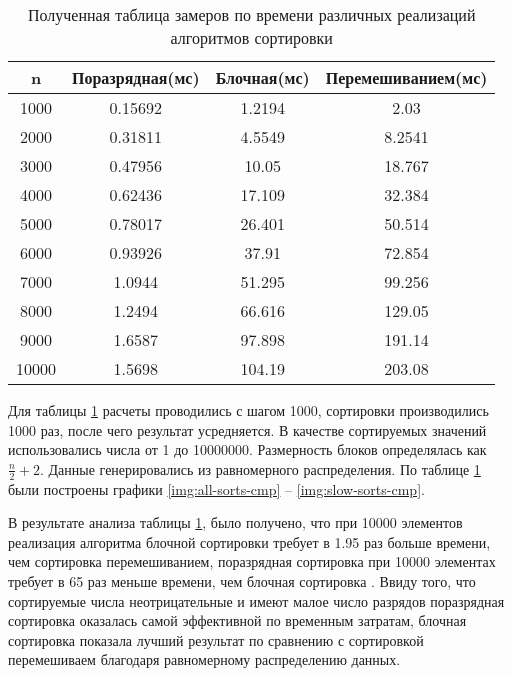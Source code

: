 \begin{table}[ht]
	\centering
	\caption{Полученная таблица замеров по времени различных реализаций алгоритмов сортировки}
	\begin{tabular}{|c|c|c|c|}
		\hline
		n     & Поразрядная(мс) & Блочная(мс) & Перемешиванием(мс) \\ \hline
		1000  & 0.15692         & 1.2194      & 2.03               \\ \hline
		2000  & 0.31811         & 4.5549      & 8.2541             \\ \hline
		3000  & 0.47956         & 10.05       & 18.767             \\ \hline
		4000  & 0.62436         & 17.109      & 32.384             \\ \hline
		5000  & 0.78017         & 26.401      & 50.514             \\ \hline
		6000  & 0.93926         & 37.91       & 72.854             \\ \hline
		7000  & 1.0944          & 51.295      & 99.256             \\ \hline
		8000  & 1.2494          & 66.616      & 129.05             \\ \hline
		9000  & 1.6587          & 97.898      & 191.14             \\ \hline
		10000 & 1.5698          & 104.19      & 203.08             \\ \hline
	\end{tabular}
	\label{t:timings}
\end{table}

Для таблицы \ref{t:timings} расчеты проводились с шагом 1000, сортировки производились 1000 раз, после чего результат усредняется. В качестве сортируемых значений использовались  числа от 1 до 10000000. Размерность блоков определялась как $\frac{n}{2} + 2$. Данные генерировались из равномерного распределения.
По таблице \ref{t:timings} были построены графики \ref{img:all-sorts-cmp} -- \ref{img:slow-sorts-cmp}.


В результате анализа таблицы \ref{t:timings}, было получено, что при 10000 элементов реализация алгоритма  блочной сортировки требует в 1.95 раз больше  времени, чем сортировка перемешиванием, поразрядная сортировка при 10000 элементах требует в 65 раз меньше времени, чем блочная сортировка . Ввиду того, что сортируемые числа неотрицательные и имеют малое число разрядов поразрядная сортировка оказалась самой эффективной по временным затратам, блочная сортировка показала лучший результат по сравнению с сортировкой перемешиваем благодаря равномерному распределению данных.


